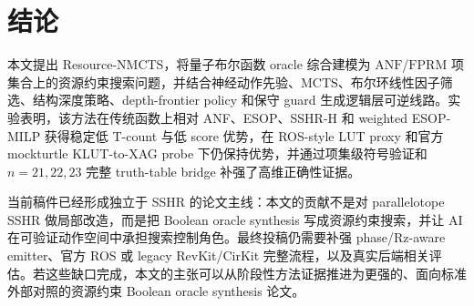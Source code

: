 \documentclass[UTF8,fontset=macnew,11pt]{ctexart}
\newcommand{\method}{Resource-NMCTS}
\newcommand{\anf}{\ensuremath{\mathrm{ANF}}}
\newcommand{\fprm}{\ensuremath{\mathrm{FPRM}}}
\newcommand{\mcts}{\ensuremath{\mathrm{MCTS}}}
\begin{document}
\section{结论}

本文提出 \method{}，将量子布尔函数 oracle 综合建模为 \anf{}/\fprm{} 项集合上的资源约束搜索问题，并结合神经动作先验、\mcts{}、布尔环线性因子筛选、结构深度策略、depth-frontier policy 和保守 guard 生成逻辑层可逆线路。实验表明，该方法在传统函数上相对 ANF、ESOP、SSHR-H 和 weighted ESOP-MILP 获得稳定低 T-count 与低 score 优势，在 ROS-style LUT proxy 和官方 mockturtle KLUT-to-XAG probe 下仍保持优势，并通过项集级符号验证和 $n=21,22,23$ 完整 truth-table bridge 补强了高维正确性证据。

当前稿件已经形成独立于 SSHR 的论文主线：本文的贡献不是对 parallelotope SSHR 做局部改造，而是把 Boolean oracle synthesis 写成资源约束搜索，并让 AI 在可验证动作空间中承担搜索控制角色。最终投稿仍需要补强 phase/Rz-aware emitter、官方 ROS 或 legacy RevKit/CirKit 完整流程，以及真实后端相关评估。若这些缺口完成，本文的主张可以从阶段性方法证据推进为更强的、面向标准外部对照的资源约束 Boolean oracle synthesis 论文。
\end{document}
